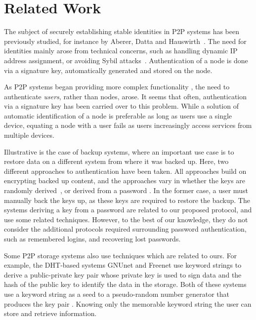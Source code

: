 \section{Related Work} 

The subject of securely establishing stable identities in P2P systems has been
previously studied, for instance by Aberer, Datta and
Hauswirth~\cite{AbererDH04}. The need for identities mainly arose from
technical concerns, such as handling dynamic IP address assignment, or
avoiding Sybil attacks~\cite{Douceur02}. Authentication of a node is done via
a signature key, automatically generated and stored on the node.

As P2P systems began providing more complex functionality
\cite{IsdalPKA10,CutilloMS09,AbbasPES09,LillibridgeEBBI03}, the need to authenticate
\emph{users}, rather than nodes, arose. It seems that often, authentication
via a signature key has been carried over to this problem. While a solution
of automatic identification of a node is preferable as long as users use a
single device, equating a node with a user fails as users increasingly access
services from multiple devices.

Illustrative is the case of backup systems, where an important use case is to
restore data on a different system from where it was backed up. Here, two
different approaches to authentication have been taken. All approaches build
on encrypting backed up content, and the approaches vary in whether the keys
are randomly derived~\cite{LillibridgeEBBI03}, or derived from a password
\cite{CoxMN02}. In the former case, a user must manually
back the keys up, as these keys are required to restore the backup. The
systems deriving a key from a password are related to our proposed protocol,
and use some related techniques. However, to the best of our knowledge, they
do not consider the additional protocols required surrounding password
authentication, such as remembered logins, and recovering lost passwords.

Some P2P storage systems also use techniques which are related to ours.
For example, the DHT-based systems 
GNUnet and Freenet use keyword strings to derive a public-private key pair
whose private key is used to sign data and the hash of the public key to
identify the data in the storage. Both of these systems use a keyword string
as a seed to a pseudo-random number generator that produces the key pair
\cite{Clarke10,Bennett03}. Knowing only the memorable keyword string the user
can store and retrieve information.

